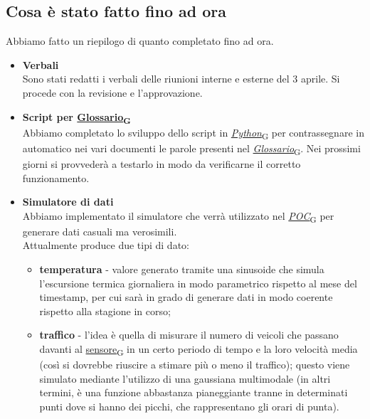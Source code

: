 \documentclass[italian,12pt]{article}
\begin{document}
\subsection{Cosa è stato fatto fino ad ora}
Abbiamo fatto un riepilogo di quanto completato fino ad ora.
\begin{itemize}
	\item \textbf{Verbali} \\
	Sono stati redatti i verbali delle riunioni interne e esterne del 3 aprile. Si procede con la revisione e l'approvazione.
	\item \textbf{Script per \href{https://7last.github.io/docs/rtb/documentazione-interna/glossario#glossario}{Glossario\textsubscript{G}}} \\
	Abbiamo completato lo sviluppo dello script in \href{https://7last.github.io/docs/rtb/documentazione-interna/glossario#python}{\textit{Python}\textsubscript{G}} per contrassegnare in automatico nei vari documenti le parole presenti nel \href{https://7last.github.io/docs/rtb/documentazione-interna/glossario#glossario}{\textit{Glossario}\textsubscript{G}}. Nei prossimi giorni si provvederà a testarlo in modo da verificarne il corretto funzionamento.
	\item \textbf{Simulatore di dati} \\
	Abbiamo implementato il simulatore che verrà utilizzato nel \href{https://7last.github.io/docs/rtb/documentazione-interna/glossario#poc}{\textit{POC}\textsubscript{G}} per generare dati casuali ma verosimili. \\
	Attualmente produce due tipi di dato:
	\begin{itemize}
		\item \textbf{temperatura} - valore generato tramite una sinusoide che simula l'escursione termica giornaliera in modo parametrico rispetto al mese del timestamp, per cui sarà in grado di generare dati in modo coerente rispetto alla stagione in corso;
		\item \textbf{traffico} - l'idea è quella di misurare il numero di veicoli che passano davanti al \href{https://7last.github.io/docs/rtb/documentazione-interna/glossario#sensore}{sensore\textsubscript{G}} in un certo periodo di tempo e la loro velocità media (così si dovrebbe riuscire a stimare più o meno il traffico); questo viene simulato mediante l'utilizzo di una gaussiana multimodale (in altri termini, è una funzione abbastanza pianeggiante tranne in determinati punti dove si hanno dei picchi, che rappresentano gli orari di punta).
	\end{itemize}

\end{itemize}
\end{document}
